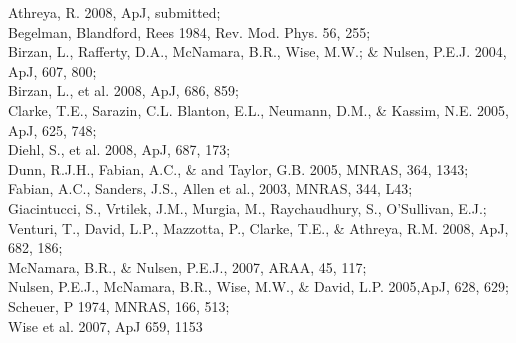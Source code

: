 \documentclass[letterpaper,11pt]{article}
\begin{document}
Athreya, R. 2008, ApJ, submitted;\\
Begelman, Blandford, Rees 1984, Rev. Mod. Phys. 56, 255;\\
Birzan, L., Rafferty, D.A., McNamara, B.R., Wise, M.W.; \& Nulsen, P.E.J. 2004, ApJ, 607, 800;\\
Birzan, L., et al. 2008, ApJ, 686, 859;\\
Clarke, T.E., Sarazin, C.L. Blanton, E.L., Neumann, D.M., \& Kassim, N.E. 2005, ApJ, 625, 748;\\
Diehl, S., et al. 2008, ApJ, 687, 173;\\
Dunn, R.J.H., Fabian, A.C., \& and Taylor, G.B. 2005, MNRAS, 364, 1343;\\
Fabian, A.C., Sanders, J.S., Allen et al., 2003, MNRAS, 344, L43;\\
Giacintucci, S., Vrtilek, J.M., Murgia, M., Raychaudhury, S., O'Sullivan, E.J.; Venturi, T., David, L.P., Mazzotta, P., Clarke, T.E., \& Athreya, R.M. 2008, ApJ, 682, 186;\\
McNamara, B.R., \& Nulsen, P.E.J., 2007, ARAA, 45, 117;\\
Nulsen, P.E.J., McNamara, B.R., Wise, M.W., \& David, L.P. 2005,ApJ, 628, 629;\\
Scheuer, P 1974, MNRAS, 166, 513;\\
Wise et al. 2007, ApJ 659, 1153
\end{document}
